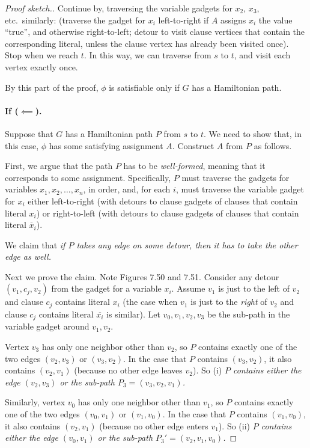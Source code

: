 \documentclass[11pt]{article}
\begin{document}
\begin{proof}[Proof sketch.]
  Continue by, traversing the variable gadgets for $x_2$, $x_3$, etc.~similarly:
  (traverse the gadget for $x_i$ left-to-right if $A$ assigns $x_i$ the value ``true'',
  and otherwise right-to-left;
  detour to visit clause vertices that contain the corresponding 
  literal, unless the clause vertex has already been visited once).
  Stop when we reach $t$.
  In this way, we can traverse from $s$ to $t$, and visit each vertex exactly once.

  By this part of the proof,
  $\phi$ is satisfiable only if
  $G$ has a Hamiltonian path.

  \paragraph{If ($\impliedby$).}
  Suppose that $G$ has a Hamiltonian path $P$ from $s$ to $t$.
  We need to show that, in this case, $\phi$ has some satisfying assignment $A$.
  Construct $A$ from $P$ as follows.

  First, we argue that the path $P$ has to be \emph{well-formed}, meaning
  that it corresponds to some assignment.
  Specifically, $P$ must traverse the gadgets for variables $x_1,x_2,\ldots,x_n$, in order,
  and, for each $i$, must traverse the variable gadget for $x_i$ either left-to-right
  (with detours to clause gadgets of clauses that contain literal $x_i$)
  or right-to-left
  (with detours to clause gadgets of clauses that contain literal $\overline x_i$).

  We claim that
  \emph{if $P$ takes any edge on some detour, then it has to take the other edge as well.}

  Next we prove the claim.
  Note Figures 7.50 and 7.51.
  Consider any detour $(v_1,c_j,v_2)$ from the gadget for a variable $x_i$.
  Assume $v_1$ is just to the left of $v_2$ and clause $c_j$ contains literal $x_i$
  (the case when $v_1$ is just to the \emph{right} of $v_2$ 
  and clause $c_j$ contains literal $\overline{x_i}$ is similar).
  Let $v_0,v_1,v_2,v_3$ be the sub-path in the variable gadget around $v_1,v_2$.

  Vertex $v_3$ has only one neighbor other than $v_2$,
  so $P$ contains exactly one of the two edges $(v_2,v_3)$ or $(v_3,v_2)$.
  In the case that $P$ contains $(v_3,v_2)$, it also contains $(v_2,v_1)$
  (because no other edge leaves $v_2$).
  So (i) 
  \emph{$P$ contains either the edge $(v_2,v_3)$ or the sub-path $P_3 = (v_3,v_2,v_1)$.}

  Similarly, vertex $v_0$ has only one neighbor other than $v_1$,
  so $P$ contains exactly one of the two edges $(v_0,v_1)$ or $(v_1,v_0)$.
  In the case that $P$ contains $(v_1,v_0)$, it also contains $(v_2,v_1)$
  (because no other edge enters $v_1$).
  So (ii)
  \emph{$P$ contains either the edge $(v_0,v_1)$ or the sub-path $P_3' =(v_2,v_1,v_0)$.}


\end{proof}
\end{document}
